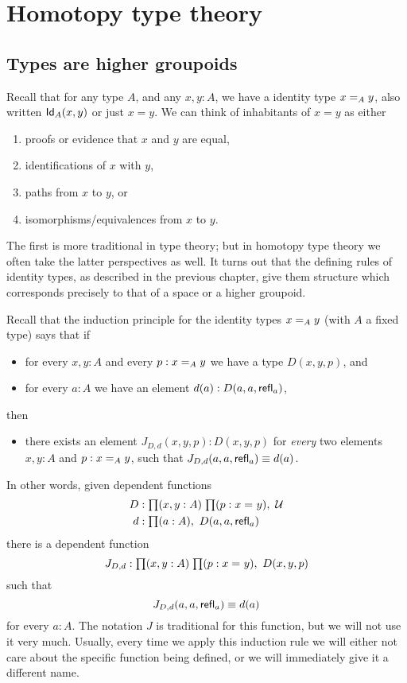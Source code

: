 \chapter{Homotopy type theory}
\label{cha:basics}

\section{Types are higher groupoids}
\label{sec:equality}

Recall that for any type $A$, and any $x,y:A$, we have a identity type $\id[A]{x}{y}$, also written $\idtype[A]{x}{y}$ or just $x=y$.
We can think of inhabitants of $x=y$ as either
\begin{enumerate}
\item proofs or evidence that $x$ and $y$ are equal,
\item identifications of $x$ with $y$,
\item paths from $x$ to $y$, or
\item isomorphisms/equivalences from $x$ to $y$.
\end{enumerate}
The first is more traditional in type theory; but in homotopy type theory we often take the latter perspectives as well.
It turns out that the defining rules of identity types, as described in the previous chapter, give them structure which corresponds precisely to that of a space or a higher groupoid.

Recall that the induction principle for the identity types $\id[A]{x}{y}$ (with $A$ a fixed type) says that if
\begin{itemize}
\item for every $x,y:A$ and every $p:\id[A]xy$ we have a type $D(x,y,p)$, and
\item for every $a:A$ we have an element $d(a):D(a,a,\refl a)$, 
\end{itemize}
then
\begin{itemize}
\item there exists an element $J_{D,d}(x,y,p):D(x,y,p)$ for \emph{every} two elements $x,y:A$ and $p:\id[A]xy$, such that $J_{D,d}(a,a,\refl a) \jdeq d(a)$.
\end{itemize}
In other words, given dependent functions
\begin{align*}
D & :\prd{x,y:A}{p:\id{x}{y}} \type\\
d & :\prd{a:A} D(a,a,\refl{a})
\end{align*}
there is a dependent function
\[J_{D,d}:\prd{x,y:A}{p:\id{x}{y}} D(x,y,p)\]
such that 
\begin{equation}\label{eq:Jconv}
J_{D,d}(a,a,\refl{a})\jdeq d(a)
\end{equation}
for every $a:A$.
The notation $J$ is traditional for this function, but we will not use it very much.
Usually, every time we apply this induction rule we will either not care about the specific function being defined, or we will immediately give it a different name.

